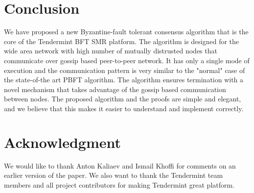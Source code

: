 \section{Conclusion} \label{sec:conclusion}

We have proposed a new Byzantine-fault tolerant consensus algorithm that is the
core of the Tendermint BFT SMR platform. The algorithm is designed for the wide
area network with high number of mutually distrusted nodes that communicate
over gossip based peer-to-peer network. It has only a single mode of execution
and the communication pattern is very similar to the "normal" case of the
state-of-the art PBFT algorithm. The algorithm ensures termination with a novel
mechanism that takes advantage of the gossip based communication between nodes.
The proposed algorithm and the proofs are simple and elegant, and we believe
that this makes it easier to understand and implement correctly.   

\section*{Acknowledgment}

We would like to thank Anton Kaliaev and Ismail Khoffi for comments on an earlier version of the paper. We also want to thank the Tendermint team members and all project contributors for making Tendermint great platform.  
